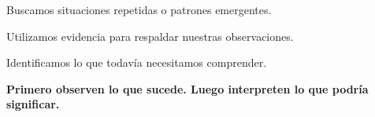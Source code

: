 \documentclass[12pt,a4paper]{article}
\newcommand{\checkbox}{\fbox{\rule{0pt}{0.8ex}\rule{0.8ex}{0pt}}}
\newcommand{\sol}[1]{{\color{solutionred}\small\strut #1\strut}}
\begin{document}
	\vspace{0.15cm}
	
	\checkbox\makebox[0pt][r]{\sol{\(\times\)}\hspace{0.15em}}\quad Buscamos situaciones repetidas o patrones emergentes.
	
	\vspace{0.15cm}
	
	\checkbox\makebox[0pt][r]{\sol{\(\times\)}\hspace{0.15em}}\quad Utilizamos evidencia para respaldar nuestras observaciones.
	
	\vspace{0.15cm}
	
	\checkbox\makebox[0pt][r]{\sol{\(\times\)}\hspace{0.15em}}\quad Identificamos lo que todavía necesitamos comprender.
	
	\vspace{0.3cm}
	
	\vspace{-1.5mm}\begin{center}
		\textbf{Primero observen lo que sucede. Luego interpreten lo que podría significar.}
	\end{center}\vspace{-1.5mm}

	
\end{document}
